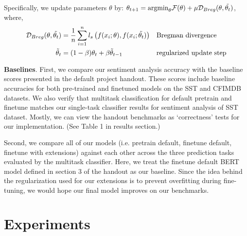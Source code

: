 \documentclass{article}
\begin{document}
Specifically, we update parameters $\theta$ by: $\theta_{t+1} = \text{argmin}_{\theta} \mathcal{F}(\theta) + \mu \mathcal{D}_{Breg}(\theta, \Tilde{\theta_{t}})$, where,
\begin{align*}
\mathcal{D}_{Breg}(\theta, \Tilde{\theta_{t}}) & = \frac{1}{n} \sum_{i=1}^{n} l_{s} \left( f(x_{i}; \theta), f(x_{i}; \Tilde{\theta_{t}}) \right) && \text{Bregman divergence} \\
\Tilde{\theta}_{t} & = (1 - \beta)\theta_{t} + \beta \Tilde{\theta}_{t-1} && \text{regularized update step}
\end{align*}


\textbf{Baselines}. First, we compare our sentiment analysis accuracy with the baseline scores presented in the default project handout. These scores include baseline accuracies for both pre-trained and finetuned models on the SST and CFIMDB datasets. We also verify that multitask classification for default pretrain and finetune matches our single-task classifier results for sentiment analysis of SST dataset. Mostly, we can view the handout benchmarks as `correctness' tests for our implementation. (See Table 1 in results section.)

Second, we compare all of our models (i.e. pretrain default, finetune default, finetune with extensions) against each other across the three prediction tasks evaluated by the multitask classifier. Here, we treat the finetune default BERT model defined in section 3 of the handout as our baseline. Since the idea behind the regularization used for our extensions is to prevent overfitting during fine-tuning, we would hope our final model improves on our benchmarks. 



\section{Experiments}
\end{document}
